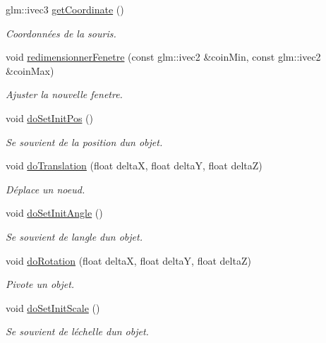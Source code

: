 \begin{DoxyCompactItemize}
glm\+::ivec3 \hyperlink{group__inf2990_ga10b1388ade61cff79fb4a96835a77873}{get\+Coordinate} ()
\begin{DoxyCompactList}\small\item\em Coordonnées de la souris. \end{DoxyCompactList}\item 
\hypertarget{group__inf2990_ga0a03742a7fa2215a6dd6de99cbfd7b05}{}void \hyperlink{group__inf2990_ga0a03742a7fa2215a6dd6de99cbfd7b05}{redimensionner\+Fenetre} (const glm\+::ivec2 \&coin\+Min, const glm\+::ivec2 \&coin\+Max)\label{group__inf2990_ga0a03742a7fa2215a6dd6de99cbfd7b05}

\begin{DoxyCompactList}\small\item\em Ajuster la nouvelle fenetre. \end{DoxyCompactList}\item 
void \hyperlink{group__inf2990_gacbc609209644f410f7a576a8d1e509d0}{do\+Set\+Init\+Pos} ()
\begin{DoxyCompactList}\small\item\em Se souvient de la position d\textquotesingle{}un objet. \end{DoxyCompactList}\item 
void \hyperlink{group__inf2990_ga3c29bb5fb742aacf7bea3f62357c4f48}{do\+Translation} (float delta\+X, float delta\+Y, float delta\+Z)
\begin{DoxyCompactList}\small\item\em Déplace un noeud. \end{DoxyCompactList}\item 
void \hyperlink{group__inf2990_gadf7aee8a39d60a055bef3cd05cdda2db}{do\+Set\+Init\+Angle} ()
\begin{DoxyCompactList}\small\item\em Se souvient de l\textquotesingle{}angle d\textquotesingle{}un objet. \end{DoxyCompactList}\item 
void \hyperlink{group__inf2990_ga51bb0f8d8e9a6c421ca688e83e10d670}{do\+Rotation} (float delta\+X, float delta\+Y, float delta\+Z)
\begin{DoxyCompactList}\small\item\em Pivote un objet. \end{DoxyCompactList}\item 
void \hyperlink{group__inf2990_gaccc885ec8fc20fa6709a2f74a609ce32}{do\+Set\+Init\+Scale} ()
\begin{DoxyCompactList}\small\item\em Se souvient de l\textquotesingle{}échelle d\textquotesingle{}un objet. \end{DoxyCompactList}\item 

\end{DoxyCompactItemize}
